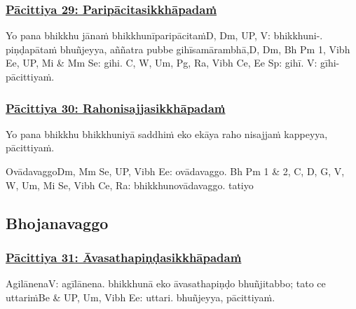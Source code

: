\subsubsection*{\hyperref[exp29]{Pācittiya 29: Paripācitasikkhāpadaṁ}}
\label{pac29}

Yo pana bhikkhu jānaṁ bhikkhunīparipācitaṁ\makeatletter\hyperlink{endnote-appendix}\makeatother  D, Dm, UP, V: bhikkhuni-. piṇḍapātaṁ bhuñjeyya, aññatra pubbe gihīsamārambhā,\makeatletter\hyperlink{endnote-appendix}\makeatother D, Dm, Bh Pm 1, Vibh Ee, UP, Mi & Mm Se: gihi. C, W, Um, Pg, Ra, Vibh Ce, Ee Sp: gihī. V: gīhi- pācittiyaṁ.



\subsubsection*{\hyperref[exp30]{Pācittiya 30: Rahonisajjasikkhāpadaṁ}}
\label{pac30}

Yo pana bhikkhu bhikkhuniyā saddhiṁ eko ekāya raho nisajjaṁ kappeyya, pācittiyaṁ.

\begin{center}
	Ovādavaggo\makeatletter\hyperlink{endnote-appendix}\makeatother Dm, Mm Se, UP, Vibh Ee: ovādavaggo. Bh Pm 1 & 2, C, D, G, V, W, Um, Mi Se, Vibh Ce, Ra: bhikkhunovādavaggo. tatiyo
\end{center}



\subsection{Bhojanavaggo}

\subsubsection*{\hyperref[exp31]{Pācittiya 31: Āvasathapiṇḍasikkhāpadaṁ}}
\label{pac31}

Agilānena\makeatletter\hyperlink{endnote-appendix}\makeatother V: agīlānena. bhikkhunā eko āvasathapiṇḍo bhuñjitabbo; tato ce uttariṁ\makeatletter\hyperlink{endnote-appendix}\makeatother Be & UP, Um, Vibh Ee: uttari. bhuñjeyya, pācittiyaṁ.



